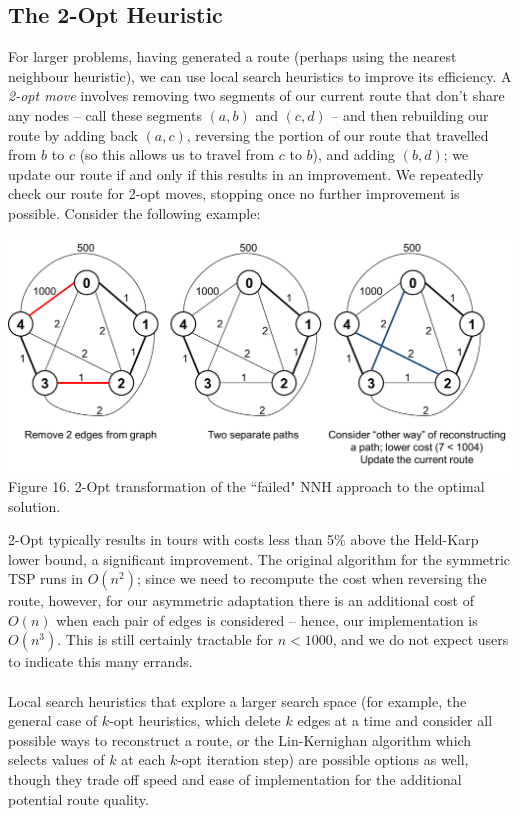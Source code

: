 \documentclass[a4paper, 10pt]{report}
\begin{document}
\subsection{The 2-Opt Heuristic}
For larger problems, having generated a route (perhaps using the nearest neighbour heuristic), we can use local search heuristics to improve its efficiency. A \textit{2-opt move} involves removing two segments of our current route that don't share any nodes -- call these segments $(a, b)$ and $(c, d)$ -- and then rebuilding our route by adding back $(a, c)$, reversing the portion of our route that travelled from $b$ to $c$ (so this allows us to travel from $c$ to $b$), and adding $(b, d)$; we update our route if and only if this results in an improvement. We repeatedly check our route for 2-opt moves, stopping once no further improvement is possible. \cite{nnh,tsp-heuristics} Consider the following example:
\begin{center}
\includegraphics[scale=0.4]{2_opt.png}\\
Figure 16. 2-Opt transformation of the ``failed" NNH approach to the optimal solution.
\end{center}
2-Opt typically results in tours with costs less than 5\% above the Held-Karp lower bound, a significant improvement. \cite{nnh} The original algorithm for the symmetric TSP runs in $O(n^2)$; since we need to recompute the cost when reversing the route, however, for our asymmetric adaptation there is an additional cost of $O(n)$ when each pair of edges is considered -- hence, our implementation is $O(n^3)$. This is still certainly tractable for $n < 1000$, and we do not expect users to indicate this many errands. \\\\
Local search heuristics that explore a larger search space (for example, the general case of $k$-opt heuristics, which delete $k$ edges at a time and consider all possible ways to reconstruct a route, or the Lin-Kernighan algorithm which selects values of $k$ at each $k$-opt iteration step) are possible options as well, though they trade off speed and ease of implementation for the additional potential route quality. \cite{tsp-heuristics}
\end{document}
